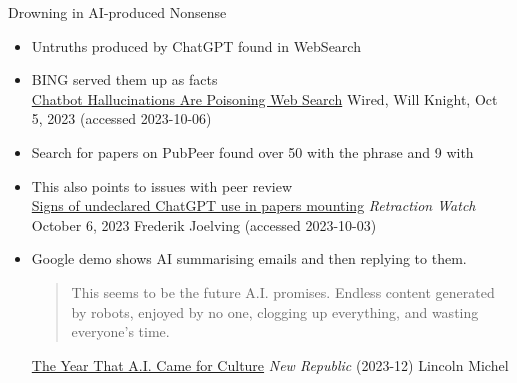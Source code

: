 \documentclass{beamer}
\begin{document}
\begin{frame}{Drowning in AI-produced Nonsense}

\begin{itemize}
\item Untruths produced by ChatGPT found in WebSearch
\item BING served them up as facts
  \\ {\small \href{https://www.wired.com/story/fast-forward-chatbot-hallucinations-are-poisoning-web-search/}{Chatbot Hallucinations Are Poisoning Web Search} Wired, Will Knight, Oct 5, 2023 (accessed 2023-10-06)}
\item Search for papers on PubPeer found over 50 with the phrase  and 9 with 
\item This also points to issues with peer review
  \\{\small 
\href{https://retractionwatch.com/2023/10/06/signs-of-undeclared-chatgpt-use-in-papers-mounting/}{Signs of undeclared ChatGPT use in papers mounting} \textit{Retraction Watch} October 6, 2023 Frederik Joelving (accessed 2023-10-03)}

\newpage 


\item Google demo shows AI summarising emails and then replying to them.
  \begin{quote}
    This seems to be the future A.I. promises. Endless content generated by robots, enjoyed by no one, clogging up everything, and wasting everyone’s time.
  \end{quote}
  {\small
    \href{https://newrepublic.com/article/177197/year-ai-came-culture}{The Year That A.I. Came for Culture}
\textit{New Republic} (2023-12) Lincoln Michel }


\end{itemize}


\end{frame}
\end{document}
